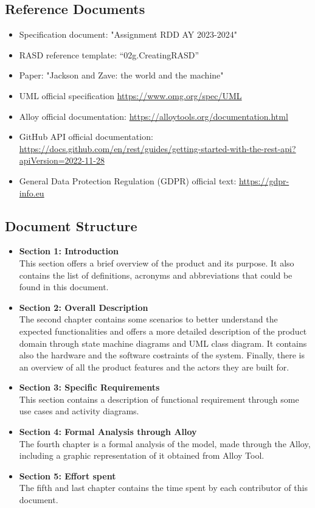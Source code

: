 \subsection{Reference Documents}
\begin{itemize}
    \item Specification document: "Assignment RDD AY 2023-2024"
    \item RASD reference template: “02g.CreatingRASD”
    \item Paper: "Jackson and Zave: the world and the machine"
    \item UML official specification \href{https://www.omg.org/spec/UML}{https://www.omg.org/spec/UML}
    \item Alloy official documentation: \href{https://alloytools.org/documentation.html}{https://alloytools.org/documentation.html}
    \item GitHub API official documentation: \href{https://docs.github.com/en/rest/guides/getting-started-with-the-rest-api?apiVersion=2022-11-28}{https://docs.github.com/en/rest/guides/getting-started-with-the-rest-api?apiVersion=2022-11-28}
    \item General Data Protection Regulation (GDPR) official text: \href{https://gdpr-info.eu}{https://gdpr-info.eu}
\end{itemize}

\subsection{Document Structure}
\begin{itemize}
    \item {\textbf{Section 1: Introduction}\\This section offers a brief overview of the product and its purpose. It also contains the list of definitions, acronyms and abbreviations that could be found in this document.}
    \item {\textbf{Section 2: Overall Description}\\The second chapter contains some scenarios to better understand the expected functionalities and offers a more detailed description of the product domain through state machine diagrams and UML class diagram. It contains also the hardware and the software costraints of the system. Finally, there is an overview of
     all the product features and the actors they are built for. }
    \item {\textbf{Section 3: Specific Requirements}\\This section contains a description of functional requirement through some use cases and activity diagrams.}
    \item {\textbf{Section 4: Formal Analysis through Alloy}\\The fourth chapter is a formal analysis of the model, made through the Alloy, including a graphic
    representation of it obtained from Alloy Tool.
    }
    \item {\textbf{Section 5: Effort spent}}\\The fifth and last chapter contains the time spent by each contributor of this document.

\end{itemize}
